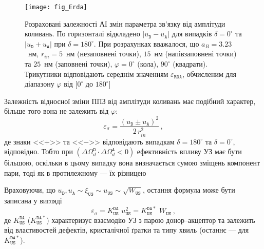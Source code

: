 \begin{figure}
\center
\texttt{[image: fig\_Erda]}
\caption{\label{fig_Erda}
Розраховані залежності АІ змін параметра зв'язку від амплітуди коливань.
По горизонталі відкладено $|u_\mathtt{D}-u_\mathtt{A}|$ для випадків $\delta=0^\circ$ та
$|u_\mathtt{D}+u_\mathtt{A}|$ при $\delta=180^\circ$.
При розрахунках вважалося, що
$a_B=3.23$~нм,
$r_{in}=5$~нм (незаповнені точки), $15$~нм (напівзаповнені точки) та $25$~нм (заповнені точки),
$\varphi=0^\circ$ (кола), $90^\circ$ (квадрати).
Трикутники відповідають середнім значенням $\varepsilon_{\mathtt{RDA}}$,
обчисленим для діапазону $\varphi$ від $[0^\circ$ до $180^\circ]$
}%
\end{figure}

Залежність відносної зміни ППЗ від амплітуди коливань має подібний характер, більше того
вона не залежить від $\varphi$:
\begin{equation}
\label{eqEpsSig}
\varepsilon_{\sigma}=\frac{(u_\mathtt{D}\pm u_\mathtt{A})^2}{2\,r_{in}^2}\,,
\end{equation}
де
знаки <<$+$>> та <<$-$>> відповідають випадкам $\delta=180^\circ$ та $\delta=0^\circ$, відповідно.
Тобто при $(\Delta\Omega_d^\mathtt{D}\cdot\Delta\Omega_d^\mathtt{A}<0)$ ефективність впливу УЗ має бути більшою,
оскільки в цьому випадку вона визначається сумою зміщень компонент пари,
тоді як в протилежному --- їх різницею


Враховуючи, що $u_\mathtt{D},u_\mathtt{A}\sim \xi_\mathtt{US}\sim u_\mathtt{US}\sim \sqrt{W_\mathtt{US}}$,
остання формула може бути записана у вигляді
\begin{equation}
\label{eqEpsSigUS}
\varepsilon_{\sigma}=K_\mathtt{US}^\mathtt{DA}\,\,u_{\mathtt{US}}^2=K_\mathtt{US}^\mathtt{DA*}\,\,W_{\mathtt{US}}\,,
\end{equation}
де $K_\mathtt{US}^\mathtt{DA}$ ($K_\mathtt{US}^\mathtt{DA*}$) характеризує взаємодію УЗ з парою донор--акцептор
та залежить від властивостей дефектів, кристалічної ґратки та типу хвиль (останнє --- для $K_\mathtt{US}^\mathtt{DA*}$).

